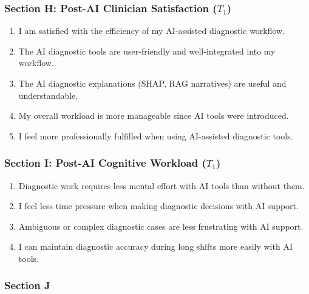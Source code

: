 \subsubsection{Section H: Post-AI Clinician Satisfaction ($T_1$)}
\label{sec:post_satisfaction}

\begin{enumerate}[label=\textbf{QS\arabic*.}]
    \item I am satisfied with the efficiency of my AI-assisted diagnostic workflow. \hfill {}    
    \item The AI diagnostic tools are user-friendly and well-integrated into my workflow. \hfill {}    
    \item The AI diagnostic explanations (SHAP, RAG narratives) are useful and understandable. \hfill {}    
    \item My overall workload is more manageable since AI tools were introduced. \hfill {}    
    \item I feel more professionally fulfilled when using AI-assisted diagnostic tools. \hfill {}    
\end{enumerate}

\subsubsection{Section I: Post-AI Cognitive Workload ($T_1$)}
\label{sec:post_workload}

\begin{enumerate}[label=\textbf{QW\arabic*.}]
    \item Diagnostic work requires less mental effort with AI tools than without them. \hfill {}    
    \item I feel less time pressure when making diagnostic decisions with AI support. \hfill {}    
    \item Ambiguous or complex diagnostic cases are less frustrating with AI support. \hfill {}    
    \item I can maintain diagnostic accuracy during long shifts more easily with AI tools. \hfill {}    
\end{enumerate}

\subsubsection{Section J}
\label{sec:ai_specific}

